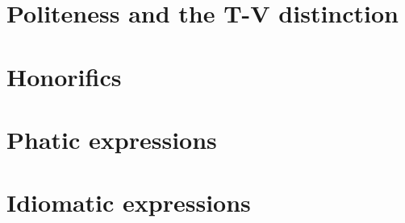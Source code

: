 
\section{Politeness and the T-V distinction}\label{sec:politeness}


\section{Honorifics}\label{sec:honorifics}


\section{Phatic expressions}\label{sec:phatic}


\section{Idiomatic expressions}\label{sec:idioms}


%
%

